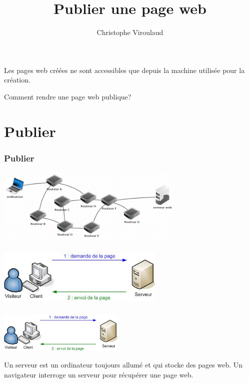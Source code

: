\documentclass[svgnames,11pt]{beamer}
\author[]{Christophe Viroulaud}
\title{Publier une page web}
\date{\framebox{\textbf{Web 03}}}
\institute{Seconde - SNT}
\begin{document}
\begin{frame}
    \titlepage
\end{frame}
\begin{frame}
    \frametitle{}

    Les pages web créées ne sont accessibles que depuis la machine utilisée pour la création.
    \begin{framed}
        \centering Comment rendre une page web publique?
    \end{framed}

\end{frame}
\section{Publier}
\begin{frame}
    \frametitle{Publier}

    \begin{center}
        \centering
        \includegraphics[width=9cm]{ressources/serveur-web.png}
        \label{IMG}
    \end{center}

\end{frame}
\begin{frame}
    \frametitle{}

    \begin{center}
        \centering
        \includegraphics[width=8cm]{ressources/http.jpeg}
        \label{IMG}
    \end{center}

\end{frame}
\begin{frame}
    \frametitle{}
    \begin{center}
        \includegraphics[width=6cm]{ressources/http.jpeg}
    \end{center}
    \begin{aretenir}[]
        Un serveur est un ordinateur toujours allumé et qui stocke des pages web. Un navigateur interroge un serveur pour récupérer une page web.
    \end{aretenir}

\end{frame}
\end{document}

